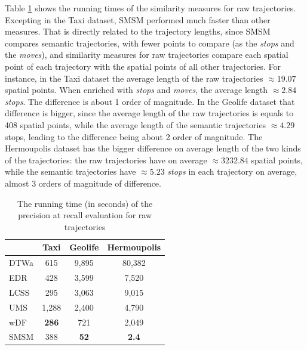 Table \ref{tab:running_time_raw} shows the running times of the similarity measures for raw trajectories. Excepting in the Taxi dataset, SMSM performed much faster than other measures. That is directly related to the trajectory lengths, since SMSM compares semantic trajectories, with fewer points to compare (as the \emph{stops} and the \emph{moves}), and similarity measures for raw trajectories compare each spatial point of each trajectory with the spatial points of all other trajectories. For instance, in the Taxi dataset the average length of the raw trajectories $\approx 19.07$ spatial points. When enriched with \emph{stops} and \emph{moves}, the average length $\approx 2.84$ \emph{stops}. The difference is about 1 order of magnitude. In the Geolife dataset that difference is bigger, since the average length of the raw trajectories is equals to 408 spatial points, while the average length of the semantic trajectories $\approx 4.29$ stops, leading to the difference being about 2 order of magnitude. The Hermoupolis dataset has the bigger difference on average length of the two kinds of the trajectories: the raw trajectories have on average $\approx 3232.84$ spatial points, while the semantic trajectories have $\approx 5.23$ \emph{stops} in each trajectory on average, almost 3 orders of magnitude of difference.

\begin{table}[ht!]
  \scriptsize
  \centering
  \begin{tabular}{|l|c|c|c|}
  \hline
& Taxi & Geolife & Hermoupolis\\
  \hline
DTWa	& 615	& 9,895	& 80,382\\
EDR		& 428	& 3,599	& 7,520\\
LCSS	& 295	& 3,063	& 9,015\\
UMS		& 1,288	& 2,400	& 4,790\\
wDF		& \textbf{286}	& 721	& 2,049\\
SMSM    & 388 & \textbf{52} & \textbf{2.4}\\
    \hline
  \end{tabular}
  \caption{The running time (in seconds) of the precision at recall evaluation for raw trajectories}
  \label{tab:running_time_raw}
\end{table}

